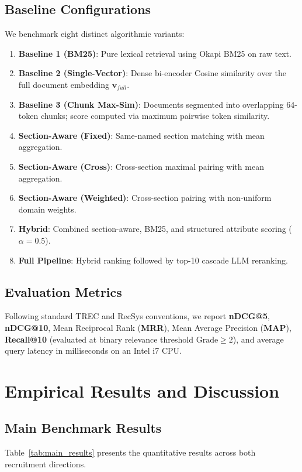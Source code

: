 \documentclass[runningheads]{llncs}
\begin{document}
\subsection{Baseline Configurations}
We benchmark eight distinct algorithmic variants:
\begin{enumerate}
    \item \textbf{Baseline 1 (BM25)}: Pure lexical retrieval using Okapi BM25 on raw text.
    \item \textbf{Baseline 2 (Single-Vector)}: Dense bi-encoder Cosine similarity over the full document embedding $\mathbf{v}_{full}$.
    \item \textbf{Baseline 3 (Chunk Max-Sim)}: Documents segmented into overlapping 64-token chunks; score computed via maximum pairwise token similarity.
    \item \textbf{Section-Aware (Fixed)}: Same-named section matching with mean aggregation.
    \item \textbf{Section-Aware (Cross)}: Cross-section maximal pairing with mean aggregation.
    \item \textbf{Section-Aware (Weighted)}: Cross-section pairing with non-uniform domain weights.
    \item \textbf{Hybrid}: Combined section-aware, BM25, and structured attribute scoring ($\alpha = 0.5$).
    \item \textbf{Full Pipeline}: Hybrid ranking followed by top-10 cascade LLM reranking.
\end{enumerate}

\subsection{Evaluation Metrics}
Following standard TREC and RecSys conventions, we report \textbf{nDCG@5}, \textbf{nDCG@10}, Mean Reciprocal Rank (\textbf{MRR}), Mean Average Precision (\textbf{MAP}), \textbf{Recall@10} (evaluated at binary relevance threshold $\text{Grade} \ge 2$), and average query latency in milliseconds on an Intel i7 CPU.

\section{Empirical Results and Discussion}

\subsection{Main Benchmark Results}
Table~\ref{tab:main_results} presents the quantitative results across both recruitment directions.
\end{document}
